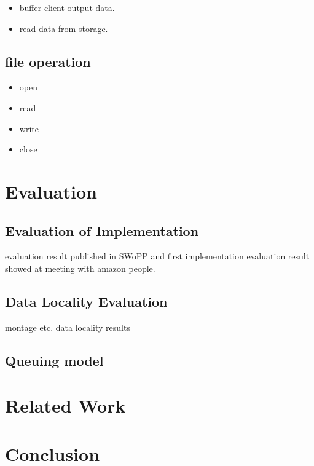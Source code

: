 \documentclass{article}
\begin{document}
\begin{itemize}
	\item buffer client output data.
	\item read data from storage.
\end{itemize}

\subsection{file operation}
\begin{itemize}
  \item open
  \item read
  \item write
  \item close
\end{itemize}

\section{Evaluation}
\subsection{Evaluation of Implementation}
evaluation result published in SWoPP and first implementation evaluation result showed at meeting with amazon people.
\subsection{Data Locality Evaluation}
montage etc. data locality results
\subsection{Queuing model}
		
\section{Related Work}

\section{Conclusion}
\end{document}

